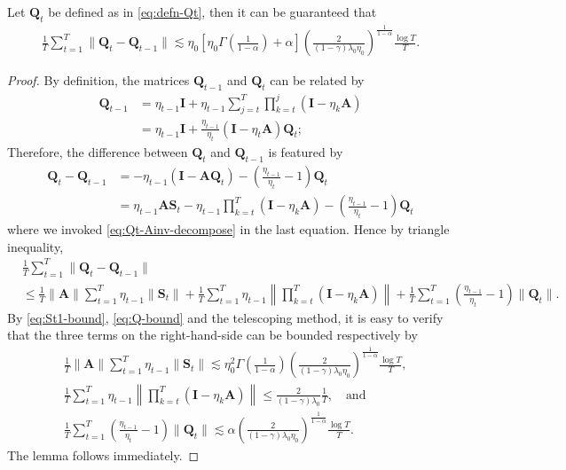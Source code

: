 \begin{customlemma}\label{lemma:delta-Q}
Let $\bm{Q}_t$ be defined as in \eqref{eq:defn-Qt}, then it can be guaranteed that
\begin{align*}
\frac{1}{T}\sum_{t=1}^T \|\bm{Q}_t - \bm{Q}_{t-1}\| \lesssim \eta_0 \left[\eta_0 \Gamma\left(\frac{1}{1-\alpha}\right)+\alpha\right]\left(\frac{2}{(1-\gamma)\lambda_0 \eta_0}\right)^{\frac{1}{1-\alpha}} \frac{\log T}{T}.
\end{align*}
\end{customlemma}
\begin{proof} By definition, the matrices $\bm{Q}_{t-1}$ and $\bm{Q}_t$ can be related by
\begin{align*}
\bm{Q}_{t-1}& = \eta_{t-1} \bm{I} + \eta_{t-1} \sum_{j=t}^T \prod_{k=t}^j (\bm{I} - \eta_k \bm{A})\\ 
&= \eta_{t-1} \bm{I} + \frac{\eta_{t-1}}{\eta_t} (\bm{I}-\eta_t \bm{A})\bm{Q}_t;
\end{align*}
Therefore, the difference between $\bm{Q}_t$ and $\bm{Q}_{t-1}$ is featured by
\begin{align*}
\bm{Q}_t - \bm{Q}_{t-1} &= -\eta_{t-1}(\bm{I} - \bm{AQ}_{t}) - \left(\frac{\eta_{t-1}}{\eta_t} - 1\right) \bm{Q}_{t} \\ 
&= \eta_{t-1}\bm{AS}_t - \eta_{t-1}\prod_{k=t}^T (\bm{I}-\eta_k \bm{A}) - \left(\frac{\eta_{t-1}}{\eta_t} - 1\right)\bm{Q}_{t}
\end{align*}
where we invoked \eqref{eq:Qt-Ainv-decompose} in the last equation. Hence by triangle inequality,
\begin{align*}
&\frac{1}{T}\sum_{t=1}^T \|\bm{Q}_t - \bm{Q}_{t-1}\|\\ 
&\leq \frac{1}{T}\|\bm{A}\|\sum_{t=1}^T  \eta_{t-1}\|\bm{S}_t\| + \frac{1}{T}\sum_{t=1}^T \eta_{t-1}\left\|\prod_{k=t}^T (\bm{I}-\eta_k \bm{A}) \right\| + \frac{1}{T}\sum_{t=1}^T\left(\frac{\eta_{t-1}}{\eta_t} - 1\right)\|\bm{Q}_{t}\|.
\end{align*}
By \eqref{eq:St1-bound}, \eqref{eq:Q-bound} and the telescoping method, it is easy to verify that the three terms on the right-hand-side can be bounded respectively by
\begin{align*}
&\frac{1}{T}\|\bm{A}\|\sum_{t=1}^T  \eta_{t-1}\|\bm{S}_t\| \lesssim \eta_0^2 \Gamma\left(\frac{1}{1-\alpha}\right)\left(\frac{2}{(1-\gamma)\lambda_0 \eta_0}\right)^{\frac{1}{1-\alpha}} \frac{\log T}{T}, \\ 
&\frac{1}{T}\sum_{t=1}^T \eta_{t-1}\left\|\prod_{k=t}^T (\bm{I}-\eta_k \bm{A}) \right\| \leq \frac{2}{(1-\gamma)\lambda_0 } \frac{1}{T}, \quad \text{and} \\ 
&\frac{1}{T}\sum_{t=1}^T\left(\frac{\eta_{t-1}}{\eta_t} - 1\right)\|\bm{Q}_{t}\| \lesssim \alpha \left(\frac{2}{(1-\gamma)\lambda_0 \eta_0}\right)^{\frac{1}{1-\alpha}} \frac{\log T}{T}.
\end{align*}
The lemma follows immediately.
\end{proof}




